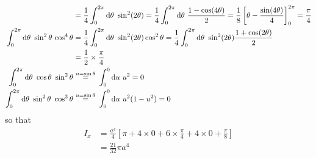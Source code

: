 {\begin{eg}[Cardoid]
\begin{align*}
     &= \frac{1}{4}\int_0^{2\pi}\dee{\theta}\ \sin^2(2\theta)
     = \frac{1}{4}\int_0^{2\pi}\dee{\theta}\ \frac{1-\cos(4\theta)}{2}
     = \frac{1}{8}\left[\theta-\frac{\sin(4\theta)}{4}\right]_0^{2\pi}
     =\frac{\pi}{4} \\
\int_0^{2\pi}\dee{\theta}\ \sin^2\theta\,\cos^4\theta
     &= \frac{1}{4}\int_0^{2\pi}\dee{\theta}\ \sin^2(2\theta)\cos^2\theta
      = \frac{1}{4}\int_0^{2\pi}\dee{\theta}\ \sin^2(2\theta)
                        \frac{1+\cos(2\theta)}{2} \\
     &=\frac{1}{2}\times\frac{\pi}{4} 
      \\
\int_0^{2\pi}\dee{\theta}\ \cos\theta\ \sin^2\theta
     &\eqover{u=\sin\theta} \int_0^0\dee{u}\ u^2
     =0 \\
\int_0^{2\pi}\dee{\theta}\ \sin^2\theta\ \cos^3\theta
     &\eqover{u=\sin\theta} \int_0^0\dee{u}\ u^2(1-u^2)
     =0 \\
\end{align*}
so that
\begin{align*}
I_x&= \frac{a^4}{4}\left[\pi + 4\times 0 +6\times \frac{\pi}{4}+4\times 0
                        +\frac{\pi}{8}\right] \\
   &=\frac{21}{32}\pi a^4
\end{align*}


\end{eg}
}



%
%
%
%


